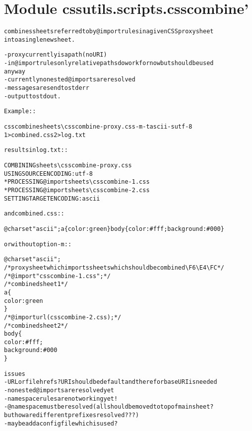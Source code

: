 %
%
%


\section{Module cssutils.scripts.csscombine'}

    \label{cssutils:scripts:csscombine'}
\begin{alltt}
combines sheets referred to by @import rules in a given CSS proxy sheet
into a single new sheet. 

- proxy currently is a path (no URI)
- in @import rules only relative paths do work for now but should be used 
  anyway
- currently no nested @imports are resolved
- messages are send to stderr
- output to stdout. 

Example::
    
    csscombine sheets{\textbackslash}csscombine-proxy.css -m -t ascii -s utf-8 
        1{\textgreater}combined.css 2{\textgreater}log.txt

results in log.txt::
    
    COMBINING sheets{\textbackslash}csscombine-proxy.css
    USING SOURCE ENCODING: utf-8
    * PROCESSING @import sheets{\textbackslash}csscombine-1.css
    * PROCESSING @import sheets{\textbackslash}csscombine-2.css
    SETTING TARGET ENCODING: ascii

and combined.css::

    @charset "ascii";a\{color:green\}body\{color:\#fff;background:\#000\}

or without option -m::

    @charset "ascii";
    /* proxy sheet which imports sheets which should be combined {\textbackslash}F6 {\textbackslash}E4 {\textbackslash}FC  */
    /* @import "csscombine-1.css"; */
    /* combined sheet 1 */
    a \{
        color: green
        \}
    /* @import url(csscombine-2.css); */
    /* combined sheet 2 */
    body \{
        color: \#fff;
        background: \#000
        \}

issues
    - URL or file hrefs? URI should be default and therefor baseURI is needed
    - no nested @imports are resolved yet
    - namespace rules are not working yet!
        - @namespace must be resolved (all should be moved to top of main sheet?
          but how are different prefixes resolved???)
    - maybe add a config file which is used?
    
\end{alltt}



